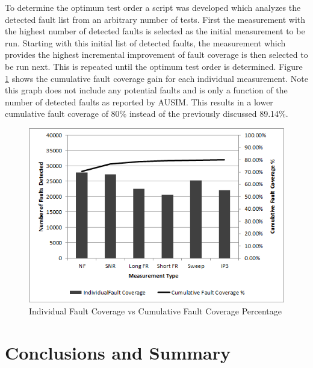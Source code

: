 \documentclass[12pt]{report}
\begin{document}
To determine the optimum test order a script was developed which analyzes the detected fault list from an arbitrary number of tests.  First the measurement with the highest number of detected faults is selected as the initial measurement to be run.  Starting with this initial list of detected faults, the measurement which provides the highest incremental improvement of fault coverage is then selected to be run next.  This is repeated until the optimum test order is determined.  Figure \ref{fig:cumulativefault} shows the cumulative fault coverage gain for each individual measurement.  Note this graph does not include any potential faults and is only a function of the number of detected faults as reported by AUSIM.  This results in a lower cumulative fault coverage of 80\% instead of the previously discussed 89.14\%.
\begin{figure}
  \begin{center}
		\includegraphics[scale=.9]{images/faultcvg-graph}
    \caption{Individual Fault Coverage vs Cumulative Fault Coverage Percentage}
  \label{fig:cumulativefault}
  \end{center}
\end{figure}


\chapter{Conclusions and Summary}
\end{document}
